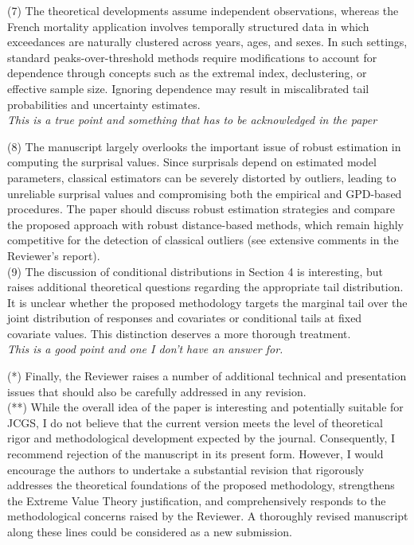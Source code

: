 \documentclass[a4paper,11pt]{article}
\begin{document}
\noindent(7) The theoretical developments assume independent observations, whereas the French mortality application involves temporally structured data in which exceedances are naturally clustered across years, ages, and sexes. In such settings, standard peaks-over-threshold methods require modifications to account for dependence through concepts such as the extremal index, declustering, or effective sample size. Ignoring dependence may result in miscalibrated tail probabilities and uncertainty estimates.\\

\noindent\textit{This is a true point and something that has to be acknowledged in the paper}

\noindent(8) The manuscript largely overlooks the important issue of robust estimation in computing the surprisal values. Since surprisals depend on estimated model parameters, classical estimators can be severely distorted by outliers, leading to unreliable surprisal values and compromising both the empirical and GPD-based procedures. The paper should discuss robust estimation strategies and compare the proposed approach with robust distance-based methods, which remain highly competitive for the detection of classical outliers (see extensive comments in the Reviewer’s report).\\

\noindent(9) The discussion of conditional distributions in Section 4 is interesting, but raises additional theoretical questions regarding the appropriate tail distribution. It is unclear whether the proposed methodology targets the marginal tail over the joint distribution of responses and covariates or conditional tails at fixed covariate values. This distinction deserves a more thorough treatment.\\

\textit{This is a good point and one I don't have an answer for.}

\noindent(*) Finally, the Reviewer raises a number of additional technical and presentation issues that should also be carefully addressed in any revision.\\

\noindent(**) While the overall idea of the paper is interesting and potentially suitable for JCGS, I do not believe that the current version meets the level of theoretical rigor and methodological development expected by the journal. Consequently, I recommend rejection of the manuscript in its present form. However, I would encourage the authors to undertake a substantial revision that rigorously addresses the theoretical foundations of the proposed methodology, strengthens the Extreme Value Theory justification, and comprehensively responds to the methodological concerns raised by the Reviewer. A thoroughly revised manuscript along these lines could be considered as a new submission.



\end{document}
